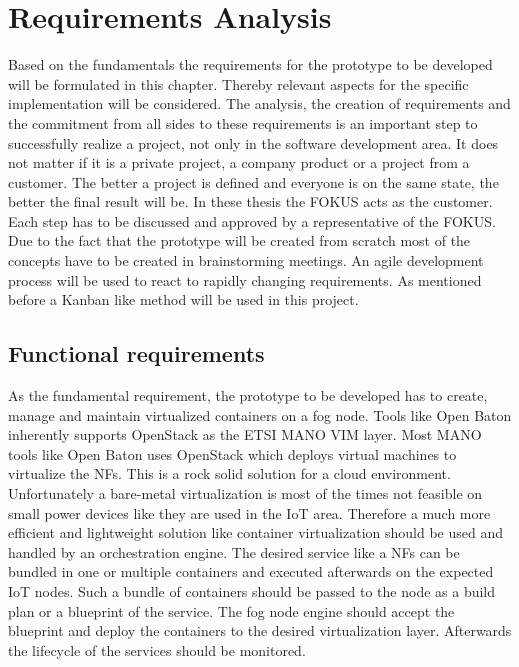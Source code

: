 \chapter{Requirements Analysis}
\label{chapter:requirements-analysis}
Based on the fundamentals the requirements for the prototype to be developed will be formulated in this chapter.
Thereby relevant aspects for the specific implementation will be considered.
The analysis, the creation of requirements and the commitment from all sides to these requirements is an important step to successfully realize a project, not only in the software development area.
It does not matter if it is a private project, a company product or a project from a customer.
The better a project is defined and everyone is on the same state, the better the final result will be.
In these thesis the \ac{FOKUS} acts as the customer.
Each step has to be discussed and approved by a representative of the \ac{FOKUS}.
Due to the fact that the prototype will be created from scratch most of the concepts have to be created in brainstorming meetings.
An agile development process will be used to react to rapidly changing requirements.
As mentioned before a Kanban like method will be used in this project.


\section{Functional requirements}
\label{section:functional-requirements}
As the fundamental requirement, the prototype to be developed has to create, manage and maintain virtualized containers on a fog node.
Tools like Open Baton inherently supports OpenStack as the \ac{ETSI} \ac{MANO} \ac{VIM} layer.
Most \ac{MANO} tools like Open Baton uses OpenStack which deploys virtual machines to virtualize the \acp{NF}.
This is a rock solid solution for a cloud environment.
Unfortunately a bare-metal virtualization is most of the times not feasible on small power devices like they are used in the \ac{IoT} area.
Therefore a much more efficient and lightweight solution like container virtualization should be used and handled by an orchestration engine.
The desired service like a \acp{NF} can be bundled in one or multiple containers and executed afterwards on the expected \ac{IoT} nodes.
Such a bundle of containers should be passed to the node as a build plan or a blueprint of the service.
The fog node engine should accept the blueprint and deploy the containers to the desired virtualization layer.
Afterwards the lifecycle of the services should be monitored.

